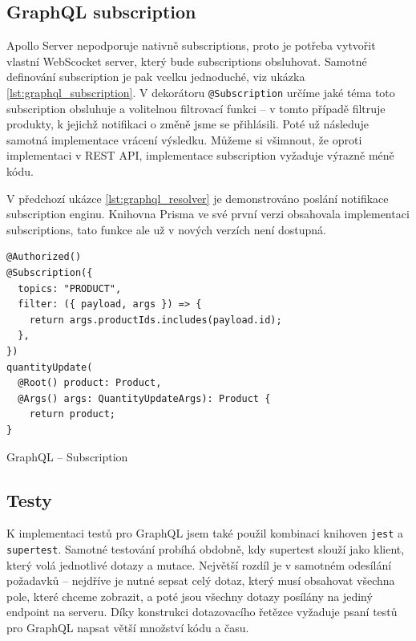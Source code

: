 \documentclass[thesis=M,czech]{FITthesis}[2019/12/23]
\begin{document}
\subsection{GraphQL subscription}
Apollo Server nepodporuje nativně subscriptions, proto je potřeba vytvořit vlastní WebScocket server, který bude subscriptions obsluhovat. Samotné definování subscription je pak vcelku jednoduché, viz ukázka \ref{lst:graphql_subscription}. V dekorátoru \texttt{@Subscription} určíme jaké téma toto subscription obsluhuje a volitelnou filtrovací funkci -- v tomto případě filtruje produkty, k jejichž notifikaci o změně jsme se přihlásili. Poté už následuje samotná implementace vrácení výsledku. Můžeme si všimnout, že oproti implementaci v REST API, implementace subscription vyžaduje výrazně méně kódu.

V předchozí ukázce \ref{lst:graphql_resolver} je demonstrováno poslání notifikace subscription enginu. Knihovna Prisma ve své první verzi obsahovala implementaci subscriptions, tato funkce ale už v nových verzích není dostupná.

\begin{listing}[H]
\begin{verbatim}
@Authorized()
@Subscription({
  topics: "PRODUCT",
  filter: ({ payload, args }) => {
    return args.productIds.includes(payload.id);
  },
})
quantityUpdate(
  @Root() product: Product,
  @Args() args: QuantityUpdateArgs): Product {
    return product;
}
\end{verbatim}
\caption{GraphQL -- Subscription}
\label{lst:graphql_subscription}
\end{listing}

\subsection{Testy}
K implementaci testů pro GraphQL jsem také použil kombinaci knihoven \texttt{jest} a \texttt{supertest}. Samotné testování probíhá obdobně, kdy supertest slouží jako klient, který volá jednotlivé dotazy a mutace. Největší rozdíl je v samotném odesílání požadavků -- nejdříve je nutné sepsat celý dotaz, který musí obsahovat všechna pole, které chceme zobrazit, a poté jsou všechny dotazy posílány na jediný endpoint na serveru. Díky konstrukci dotazovacího řetězce vyžaduje psaní testů pro GraphQL napsat větší množství kódu a času.
\end{document}
